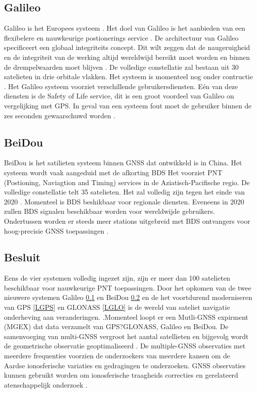 \subsection{Galileo}
\label{LGal}
Galileo is het Europees systeem \cite{LBibGNSS3}\cite{LBibGNSS4}. Het doel van Galileo is het aanbieden van een flexibelere en nauwkeurige postionerings service \cite{LBibGNSS4}. De architectuur van Galileo specificeert een globaal integriteits concept. Dit wilt zeggen dat de naugeruigheid en de integriteit van de werking altijd wereldwijd bereikt moet worden en binnen de drempelwaarden moet blijven \cite{LBibGalileo}.  De volledige constellatie zal bestaan uit 30 satelieten in drie orbitale vlakken. Het systeem is momenteel nog onder contructie \cite{LBibGNSS4}.  Het Galileo systeem voorziet verschillende gebruikersdiensten. E\'en van deze diensten is de Safety of Life service, dit is een groot voordeel van Galileo on vergelijking met GPS. In geval van een systeem fout moet de gebruiker binnen de zes seconden gewaarschuwd worden \cite{LBibGalileo}. 

\subsection{BeiDou}
\label{LBeD}
BeiDou is het satilieten systeem binnen GNSS dat ontwikkeld is in China. Het systeem wordt vaak aangeduid met de afkorting BDS \cite{LBibBeiDou} Het voorziet PNT (Postioning, Naviagtion and Timing) services in de Aziatisch-Pacifische regio. De volledige constellatie telt 35 satelieten. Het zal volledig zijn tegen het einde van 2020 \cite{LBibGNSS4}. Momenteel is BDS beshikbaar voor regionale diensten. Eveneens in 2020 zullen BDS signalen beschikbaar worden voor wereldwijde gebruikers. Ondertussen worden er steeds meer stations uitgebreid met BDS ontvangers voor hoog-precisie GNSS toepassingen \cite{LBibBeiDou}.

\subsection{Besluit}
Eens de vier systemen volledig ingezet zijn, zijn er meer dan 100 satelieten beschikbaar voor nauwkeurige PNT toepassingen. Door het opkomen van de twee nieuwere systemen Galileo \ref{LGal} en BeiDou \ref{LBeD} en de het voortdurend moderniseren van GPS \ref{LGPS} en GLONASS \ref{LGLO} is de wereld van sateliet navigatie onderheving aan veranderingen. \cite{LBibGNSS4}.Momenteel loopt er een Mutli-GNSS expirment (MGEX) dat data verzamelt van GPS?GLONASS, Galileo en BeiDou. De samenvoeging van multi-GNSS vergroot het aantal satellieten en bijgevolg wordt de geometrische observatie geoptimaliseerd \cite{LBibGNSS5}. De multiple-GNSS observaties met meerdere frequenties voorzien de onderzoekers van meerdere kansen om de Aardse ionosferische variaties en gedragingen te onderzoeken. GNSS observaties kunnen gebruikt worden om ionosferische traagheids correcties en gerelateerd atenschappelijk onderzoek \cite{LBibBeiDou}.

